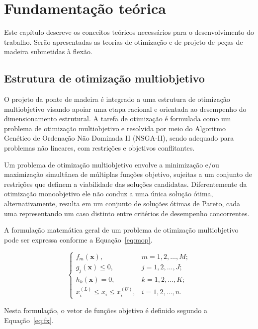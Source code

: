 \chapter{Fundamentação teórica}\label{cap:desenvolvimento}

Este capítulo descreve os conceitos teóricos necessários para o desenvolvimento do trabalho. Serão apresentadas as teorias de otimização e de projeto de peças de madeira submetidas à flexão.

\section{Estrutura de otimização multiobjetivo}

O projeto da ponte de madeira é integrado a uma estrutura de otimização multiobjetivo visando apoiar uma etapa racional e orientada ao desempenho do dimensionamento estrutural. A tarefa de otimização é formulada como um problema de otimização multiobjetivo e resolvida por meio do Algoritmo Genético de Ordenação Não Dominada II (NSGA-II), sendo adequado para problemas não lineares, com restrições e objetivos conflitantes.

Um problema de otimização multiobjetivo envolve a minimização e/ou maximização simultânea de múltiplas funções objetivo, sujeitas a um conjunto de restrições que definem a viabilidade das soluções candidatas. Diferentemente da otimização monoobjetivo ele não conduz a uma única solução ótima, alternativamente, resulta em um conjunto de soluções ótimas de Pareto, cada uma representando um caso distinto entre critérios de desempenho concorrentes.

A formulação matemática geral de um problema de otimização multiobjetivo pode ser expressa conforme a Equação~\eqref{eq:mop}.

\begin{equation}
\begin{cases} 
f_m(\mathbf{x}), & m = 1,2,\ldots,M; \\ 
g_j(\mathbf{x}) \leq 0, & j = 1,2,\ldots,J; \\ 
h_k(\mathbf{x}) = 0, & k = 1,2,\ldots,K; \\ 
x_i^{(L)} \leq x_i \leq x_i^{(U)}, & i = 1,2,\ldots,n.
\end{cases}
\label{eq:mop}
\end{equation}

Nesta formulação, o vetor de funções objetivo é definido segundo a Equação~\eqref{eq:fx}.

